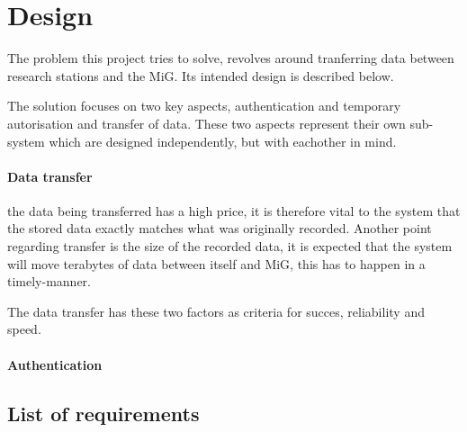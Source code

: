\section{Design}
The problem this project tries to solve, revolves around tranferring data 
between research stations and the MiG. Its intended design is described below.

The solution focuses on two key aspects, authentication and temporary
autorisation and transfer of data. These two aspects represent their own 
sub-system which are designed independently, but with eachother in mind.

\paragraph{Data transfer} the data being transferred has a high price, it is
therefore vital to the system that the stored data exactly matches what was
originally recorded. Another point regarding transfer is the size of the
recorded data, it is expected that the system will move terabytes of data
between itself and MiG, this has to happen in a timely-manner.

The data transfer has these two factors as criteria for succes, reliability and
speed.

\paragraph{Authentication} 

\subsection{List of requirements}
